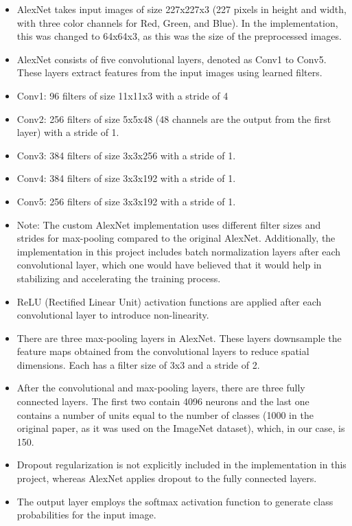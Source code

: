 \documentclass{article}
\begin{document}
\begin{itemize}
\item AlexNet takes input images of size 227x227x3 (227 pixels in height and width, with three color channels for Red, Green, and Blue). In the implementation, this was changed to 64x64x3, as this was the size of the preprocessed images.
\item AlexNet consists of five convolutional layers, denoted as Conv1 to Conv5. These layers extract features from the input images using learned filters.
\item Conv1: 96 filters of size 11x11x3 with a stride of 4
\item Conv2: 256 filters of size 5x5x48 (48 channels are the output from the first layer) with a stride of 1.
\item Conv3: 384 filters of size 3x3x256 with a stride of 1.
\item Conv4: 384 filters of size 3x3x192 with a stride of 1.
\item Conv5: 256 filters of size 3x3x192 with a stride of 1.
\item Note: The custom AlexNet implementation uses different filter sizes and strides for max-pooling compared to the original AlexNet. Additionally, the implementation in this project includes batch normalization layers after each convolutional layer, which one would have believed that it would help in stabilizing and accelerating the training process.
\item ReLU (Rectified Linear Unit) activation functions are applied after each convolutional layer to introduce non-linearity.
\item There are three max-pooling layers in AlexNet. These layers downsample the feature maps obtained from the convolutional layers to reduce spatial dimensions. Each has a filter size of 3x3 and a stride of 2.
\item After the convolutional and max-pooling layers, there are three fully connected layers. The first two contain 4096 neurons and the last one contains a number of units equal to the number of classes (1000 in the original paper, as it was used on the ImageNet dataset), which, in our case, is 150.
\item Dropout regularization is not explicitly included in the implementation in this project, whereas AlexNet applies dropout to the fully connected layers.
\item The output layer employs the softmax activation function to generate class probabilities for the input image.
\end{itemize}
\end{document}
